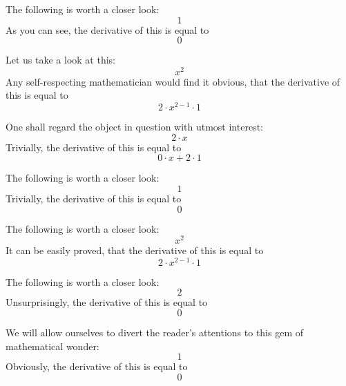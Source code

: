 \documentclass{article}
\begin{document}
The following is worth a closer look:
\begin{equation}
1 
\end{equation}
As you can see, the derivative of this is equal to
\begin{equation}
0 
\end{equation}

Let us take a look at this:
\begin{equation}
x ^{2 } 
\end{equation}
Any self-respecting mathematician would find it obvious, that the derivative of this is equal to
\begin{equation}
2 \cdot x ^{2 - 1 } \cdot 1 
\end{equation}

One shall regard the object in question with utmost interest:
\begin{equation}
2 \cdot x 
\end{equation}
Trivially, the derivative of this is equal to
\begin{equation}
0 \cdot x + 2 \cdot 1 
\end{equation}

The following is worth a closer look:
\begin{equation}
1 
\end{equation}
Trivially, the derivative of this is equal to
\begin{equation}
0 
\end{equation}

The following is worth a closer look:
\begin{equation}
x ^{2 } 
\end{equation}
It can be easily proved, that the derivative of this is equal to
\begin{equation}
2 \cdot x ^{2 - 1 } \cdot 1 
\end{equation}

The following is worth a closer look:
\begin{equation}
2 
\end{equation}
Unsurprisingly, the derivative of this is equal to
\begin{equation}
0 
\end{equation}

We will allow ourselves to divert the reader's attentions to this gem of mathematical wonder:
\begin{equation}
1 
\end{equation}
Obviously, the derivative of this is equal to
\begin{equation}
0 
\end{equation}
\end{document}
